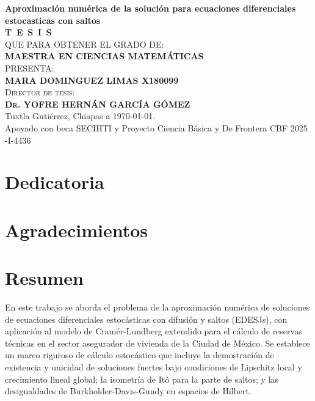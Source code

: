 \begin{titlepage}
\begin{minipage}[t][0.95\textheight][c]{0.76\textwidth}
            \begin{center}
                {\Large\bfseries Aproximación numérica de la solución para ecuaciones diferenciales estocasticas con saltos }\\[1cm]
                \textsc{\huge \textbf{T\, E\, S\, I\, S}}\\[1.5cm]
                \textsc{\large QUE PARA OBTENER EL GRADO DE:}\\[0.3cm]
                \textbf{\textsc{MAESTRA EN CIENCIAS MATEMÁTICAS}}\\[1.5cm]
                \textsc{\large PRESENTA:}\\[0.3cm]
                \textbf{\textsc{\large {MARA  DOMINGUEZ LIMAS  X180099}}}\\[1.5cm]
                {\large\scshape Director de tesis:\\[0.3cm]
                {\textbf{\large Dr. YOFRE HERNÁN GARCÍA GÓMEZ }}}\\[2.0cm]
                \large{Tuxtla Gutiérrez, Chiapas a \today.}\\[1.5cm]  
                {\large{Apoyado con beca SECIHTI y Proyecto Ciencia Básica y De Frontera CBF 2025 -I-4436}}
                
                

            \end{center}
\end{minipage}
\end{titlepage}

\pagebreak[2]

\chapter*{Dedicatoria}
\begin{center}
\itshape
\setlength{\parindent}{0pt} %
\setlength{\parskip}{1.2\baselineskip} %


\end{center}


\chapter*{Agradecimientos}


\chapter*{Resumen}

En este trabajo se aborda el problema de la aproximación numérica de
soluciones de ecuaciones diferenciales estocásticas con difusión y
saltos (EDESJs), con aplicación al modelo de Cramér-Lundberg extendido
para el cálculo de reservas técnicas en el sector asegurador de vivienda
de la Ciudad de México. Se establece un marco riguroso de cálculo
estocástico que incluye la demostración de existencia y unicidad de
soluciones fuertes bajo condiciones de Lipschitz local y crecimiento
lineal global; la isometría de Itô para la parte de saltos; y las
desigualdades de Burkholder-Davis-Gundy en espacios de Hilbert.

